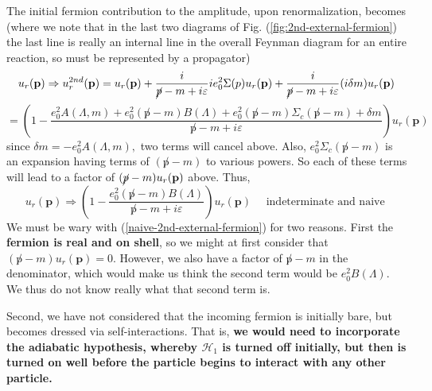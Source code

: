 The initial fermion contribution to the amplitude, upon renormalization, becomes (where we note that in the last two diagrams of Fig. (\ref{fig:2nd-external-fermion}) the last line is really an internal line in the overall Feynman diagram for an entire reaction, so must be represented by a propagator)
$$u_{r}(\mathbf{p}) \Rightarrow u_{r}^{2 n d}(\mathbf{p})=u_{r}(\mathbf{p})+\frac{i}{\cancel{p}-m+i \varepsilon} i e_{0}^{2} \Sigma(p) u_{r}(\mathbf{p})+\frac{i}{\cancel{p}-m+i \varepsilon}(i \delta m) u_{r}(\mathbf{p})$$
$$
=\left(1-\frac{e_{0}^{2} A(\Lambda, m)+e_{0}^{2}(\not p-m) B(\Lambda)+e_{0}^{2}(\not p-m) \Sigma_{c}(\not p-m)+\delta m}{\not p-m+i \varepsilon}\right)u_r(\mathbf{p})
$$
since $\delta m=-e_{0}^{2} A(\Lambda, m),$ two terms will cancel above. Also, $e_{0}^{2} \Sigma_{c}(\not p-m)$ is an expansion having terms of $(\not p-m)$ to various powers. So each of these terms will lead to a factor of $(\cancel{p}-m) u_{r}(\mathbf{p})$ above. Thus, 
\begin{equation}u_{r}(\mathbf{p}) \Rightarrow\left(1-\frac{e_{0}^{2}(\not p-m) B(\Lambda)}{\not p-m+i \varepsilon}\right) u_{r}(\mathbf{p}) \quad \text { indeterminate and naive }
\label{naive-2nd-external-fermion}
\end{equation}
We must be wary with (\ref{naive-2nd-external-fermion}) for two reasons. First the \textbf{fermion is real and on shell}, so we might at first consider that $(\not p-m) u_{r}(\mathbf{p})=0$. However, we also have a factor of $\not p-m$ in the denominator, which would make us think the second term would be $e_0^2B(\Lambda)$. We thus do not know really what that second term is.

Second, we have not considered that the incoming fermion is initially bare, but becomes dressed via self-interactions. That is, \textbf{we would need to incorporate the adiabatic hypothesis, whereby $\mathcal{H}_{1}$ is turned off initially, but then is turned on well before the particle begins to interact with any other particle.}

